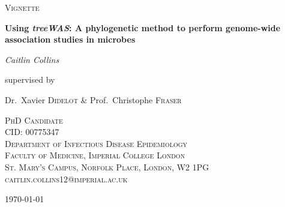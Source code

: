 \documentclass[11pt]{report}
\begin{document}
\begin{titlepage}
	\centering
	\vspace{3cm}
	{\scshape\large Vignette \par}
	\vspace{2cm}
	{\LARGE\bfseries Using \textit{treeWAS}: A phylogenetic method to perform genome-wide association studies in microbes\par}
	\vspace{8mm}
	\hline
	\vspace{1.2cm}
	{\LARGE\itshape Caitlin Collins\par} %
	\vspace{2cm}
	supervised by\par
	Dr.~Xavier \textsc{Didelot} \& Prof.~Christophe \textsc{Fraser}
		\vspace{2cm}
	{\scshape\small
	PhD Candidate\\
	CID: 00775347\\
	\vspace{8mm}
  	Department of Infectious Disease Epidemiology\\
  	Faculty of Medicine, Imperial College London\\
  	St. Mary's Campus, Norfolk Place, London, W2 1PG\\
  	caitlin.collins12@imperial.ac.uk
	\par}
  \vfill
	{\large \today\par}
\end{titlepage}
\end{document}
